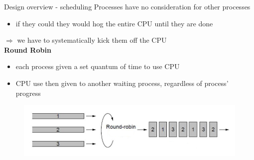 \documentclass[10pt]{beamer}
\begin{document}
\begin{frame}{Design overview - scheduling}
    Processes have no consideration for other processes
    \begin{itemize}
        \item if they could they would hog the entire CPU until they are done
    \end{itemize}
    $ \Rightarrow$ we have to systematically kick them off the CPU \\

    \textbf{Round Robin}
    \begin{itemize}
        \item each process given a set quantum of time to use CPU
        \item CPU use then given to another waiting process, regardless of
            process' progress
    \end{itemize}
    \begin{figure}
        \centering
        \includegraphics[width=.8\textwidth]{round_robin.jpg}
    \end{figure}
\end{frame}
\end{document}
